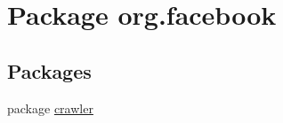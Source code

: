 \hypertarget{namespaceorg_1_1facebook}{\section{Package org.\-facebook}
\label{namespaceorg_1_1facebook}
}
\subsection*{Packages}
\begin{DoxyCompactItemize}
\item 
package \hyperlink{namespaceorg_1_1facebook_1_1crawler}{crawler}
\end{DoxyCompactItemize}
